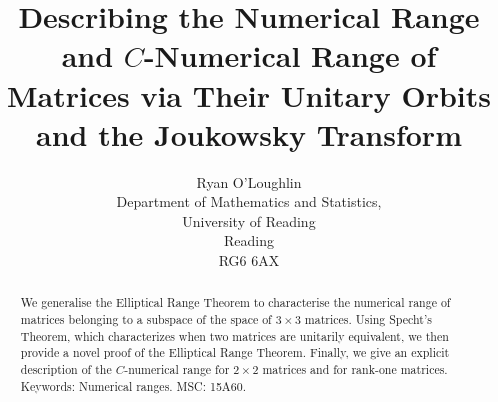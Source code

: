 \documentclass[12pt]{article}
\title{Describing the Numerical Range and $C$-Numerical Range of Matrices via Their Unitary Orbits and the Joukowsky Transform}
\author{Ryan O'Loughlin\\

Department of Mathematics and Statistics, \\
University of Reading \\
Reading \\
RG6 6AX \\
}
\date{}
\theoremstyle{plain}
\theoremstyle{definition}
\theoremstyle{remark}
\numberwithin{equation}{section}
\begin{document}
\maketitle

\begin{abstract}
We generalise the Elliptical Range Theorem to characterise the numerical range of matrices belonging to a subspace of the space of \(3 \times 3\) matrices. Using Specht's Theorem, which characterizes when two matrices are unitarily equivalent, we then provide a novel proof of the Elliptical Range Theorem. Finally, we give an explicit description of the $C$-numerical range for $2 \times 2$ matrices and for rank-one matrices.
\vskip 0.5cm
\noindent Keywords: Numerical ranges.
\vskip 0.5cm
\noindent MSC: 15A60. 
\end{abstract}
\end{document}
